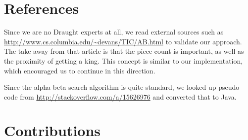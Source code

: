 \documentclass[11pt,a4paper]{article}
\begin{document}
\section{References}
Since we are no Draught experts at all, we read external sources such as \url{http://www.cs.columbia.edu/~devans/TIC/AB.html} to validate our approach. The take-away from that article is that the piece count is important, as well as the proximity of getting a king. This concept is similar to our implementation, which encouraged us to continue in this direction.

Since the alpha-beta search algorithm is quite standard, we looked up pseudo-code from \url{http://stackoverflow.com/a/15626976} and converted that to Java.

\section{Contributions}
\end{document}
